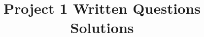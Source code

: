 %
%
%
%
%
%
%
%
%
%
%
%
%

\documentclass[11pt]{article}

\usepackage[english]{babel}
\usepackage[utf8]{inputenc}
\usepackage{amssymb}
\usepackage{xcolor}
\usepackage[colorlinks = true,
            linkcolor = blue,
            urlcolor  = blue]{hyperref}
\usepackage[a4paper,margin=1.5in]{geometry}
\usepackage{stackengine,graphicx}
\usepackage{fancyhdr}
\setlength{\headheight}{15pt}
\usepackage{microtype}
\usepackage{times}
\usepackage[shortlabels]{enumitem}
\usepackage{amsmath}
\usepackage{caption}
\usepackage{subcaption}


\usepackage{pythonhighlight}

\frenchspacing
\setlength{\parindent}{0cm} %
\setlength{\parskip}{0.3cm plus1mm minus1mm}

\pagestyle{fancy}
\fancyhf{}
\rfoot{\thepage}

\date{}

\title{\vspace{-1cm}Project 1 Written Questions Solutions}



